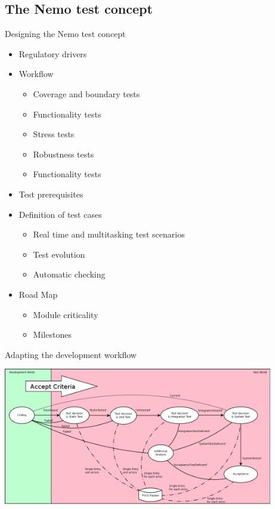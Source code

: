 \documentclass{beamer}
\begin{document}
\subsection{The Nemo test concept}

\begin{frame}{Designing the Nemo test concept}
\begin{itemize}
  \item<1-> Regulatory drivers
  \item<2-> Workflow
	\begin{itemize}
  		\item Coverage and boundary tests
  		\item Functionality tests
  		\item Stress tests
  		\item Robustness tests
  		\item Functionality tests
  	\end{itemize}
  \item<3-> Test prerequisites
  \item<4-> Definition of test cases
	\begin{itemize}
	  \item Real time and multitasking test scenarios
	  \item Test evolution
	  \item Automatic checking
	\end{itemize}
  \item<5-> Road Map
	\begin{itemize}
  		\item Module criticality
  		\item Milestones
  	\end{itemize}
\end{itemize}
\end{frame}

\begin{frame}{Adapting the development workflow}
  \begin{center}
    \includegraphics[height=6cm]{img/TestWorkflow.png}
  \end{center}
\end{frame}
\end{document}
